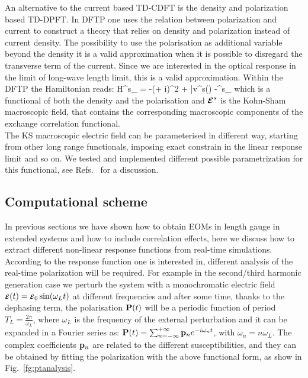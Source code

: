 An alternative to the current based TD-CDFT is the density and polarization based TD-DPFT. In DFTP one uses the relation between polarization and current to construct a theory that relies on density and polarization instead of current density. The possibility to use the polarisation as additional variable beyond the density it is a valid approximation when it is possible to disregard the transverse term of the current. Since we are interested in the optical response in the limit of long-wave length limit, this is a valid approximation. Within the DFTP the Hamiltonian reads:
\be \label{eq:dpftks}
H^{s}_\kk
= -\left(\nabla + i\kk\right )^2 + \bar v^{s}(\rr) -\Omega\Efield^{s}\cdot \nabla_\kk %
\ee
which is a functional of both the density and the polarisation and $\boldsymbol{\cal E}^{s}$ is the Kohn-Sham macroscopic field, that contains the corresponding macroscopic components of the exchange correlation functional.\\ 
The KS macroscopic electric field can be parameterised in different way, starting from other long range functionals, imposing exact constrain in the linear response limit and so on. We tested and implemented different possible parametrization for this functional, see Refs.~ for a discussion.
\subsection{Computational scheme}\label{sc:compdet}

In previous sections we have shown how to obtain EOMs in length gauge in extended systems and how to include correlation effects, here we discuss how to extract different non-linear response functions from real-time simulations.\\
According to the response function one is interested in, different analysis of the real-time polarization will be required. For example in the second/third harmonic generation case we perturb the system with a monochromatic electric field $\boldsymbol{\scriptstyle \cal E}(t) = \boldsymbol{\scriptstyle \cal E}_0 \sin(\omega_L t)$ at different frequencies and after some time, thanks to the dephasing term, the  polarisation ${\bf P}(t)$ will be a periodic function of period $T_L =\frac{2\pi}{\omega_L}$, where $\omega_L$ is the frequency of the external perturbation and it can be expanded in a Fourier series as: $ {\bf P}(t) = \sum_{n=-\infty}^{+\infty} {\bf p}_n e^{-i\omega_n t} $, with $\omega_n = n \omega_L$. The complex coefficients ${\bf p}_n$ are related to the different susceptibilities, and they can be obtained by fitting the polarization with the above functional form, as show in Fig.~\ref{fg:ptanalysis}. 

